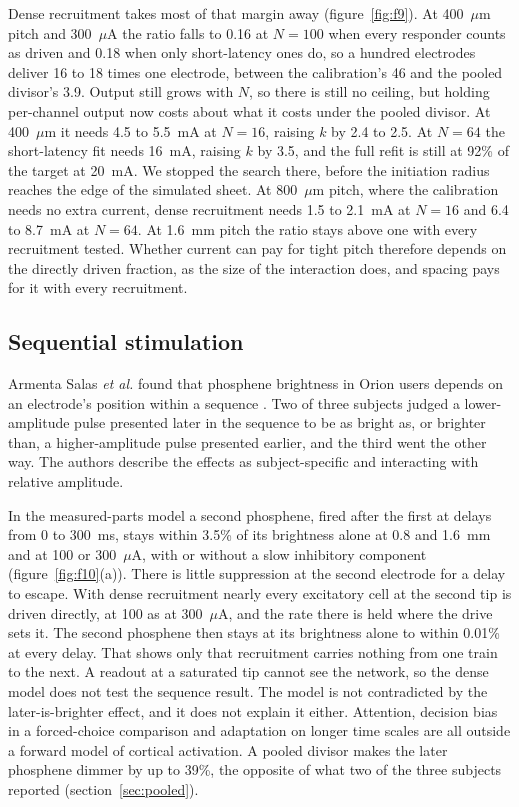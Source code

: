 \documentclass[10pt,twocolumn]{article}
\newcommand{\um}{\ensuremath{\mu\text{m}}}
\newcommand{\uA}{\ensuremath{\mu\text{A}}}
\begin{document}
Dense recruitment takes most of that margin away (figure~\ref{fig:f9}). At
400~\um{} pitch and 300~\uA{} the ratio falls to 0.16 at $N=100$ when every
responder counts as driven and 0.18 when only short-latency ones do, so a
hundred electrodes deliver 16 to 18 times one electrode, between the
calibration's 46 and the pooled divisor's 3.9. Output still grows with
$N$, so there is still no ceiling, but holding per-channel output now
costs about what it costs under the pooled divisor. At 400~\um{} it needs
4.5 to 5.5~mA at $N=16$, raising $k$ by 2.4 to 2.5. At $N=64$ the
short-latency fit needs 16~mA, raising $k$ by 3.5, and the full refit is
still at 92\% of the target at 20~mA. We stopped the search there, before
the initiation radius reaches the edge of the simulated sheet. At
800~\um{} pitch, where the calibration needs no extra current, dense
recruitment needs 1.5 to 2.1~mA at $N=16$ and 6.4 to 8.7~mA at $N=64$. At
1.6~mm pitch the ratio stays above one with every recruitment tested.
Whether current can pay for tight pitch therefore depends on the directly
driven fraction, as the size of the interaction does, and spacing pays for
it with every recruitment.

\subsection{Sequential stimulation}
\label{sec:sequence}

Armenta Salas \textit{et al.} found that phosphene brightness in Orion
users depends on an electrode's position within a sequence
\citep{armentasalas2022}. Two of three subjects judged a lower-amplitude
pulse presented later in the sequence to be as bright as, or brighter
than, a higher-amplitude pulse presented earlier, and the third went the
other way. The authors describe the effects as subject-specific and
interacting with relative amplitude.

In the measured-parts model a second phosphene, fired after the first at
delays from 0 to 300~ms, stays within 3.5\% of its brightness alone at
0.8 and 1.6~mm and at 100 or 300~\uA, with or without a slow inhibitory
component (figure~\ref{fig:f10}(a)). There is little suppression at the
second electrode for a delay to escape. With dense recruitment nearly
every excitatory cell at the second tip is driven directly, at 100 as at
300~\uA, and the rate there is held where the drive sets it. The second
phosphene then stays at its brightness alone to within 0.01\% at every
delay. That shows only that recruitment carries nothing from one train to
the next. A readout at a saturated tip cannot see the network, so the
dense model does not test the sequence result. The model is not contradicted by
the later-is-brighter effect, and it does not explain it either. Attention,
decision bias in a forced-choice comparison and adaptation on longer time
scales are all outside a forward model of cortical activation. A pooled
divisor makes the later phosphene dimmer by up to 39\%, the opposite of
what two of the three subjects reported (section~\ref{sec:pooled}).
\end{document}
